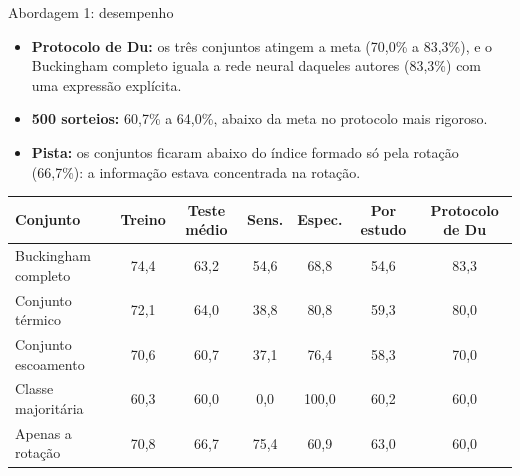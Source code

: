 \documentclass[aspectratio=169,11pt]{beamer}
\newenvironment{bullets}{\begin{itemize}\setlength{\itemsep}{5pt}}{\end{itemize}}
\begin{document}
\begin{frame}{Abordagem 1: desempenho}
\begin{bullets}
  \item \textbf{Protocolo de Du:} os três conjuntos atingem a meta (70,0\% a 83,3\%), e o Buckingham completo iguala a rede neural daqueles autores (83,3\%) com uma expressão explícita.
  \item \textbf{500 sorteios:} 60,7\% a 64,0\%, abaixo da meta no protocolo mais rigoroso.
  \item \textbf{Pista:} os conjuntos ficaram abaixo do índice formado só pela rotação (66,7\%): a informação estava concentrada na rotação.
\end{bullets}
\vspace{0.05cm}
\centering\scriptsize\setlength{\tabcolsep}{4pt}
\begin{tabular}{lcccccc}
\toprule
\textbf{Conjunto} & \textbf{Treino} & \textbf{Teste médio} & \textbf{Sens.} & \textbf{Espec.} & \textbf{Por estudo} & \textbf{Protocolo de Du} \\ \midrule
Buckingham completo & 74,4 & 63,2 & 54,6 & 68,8 & 54,6 & 83,3 \\
Conjunto térmico & 72,1 & 64,0 & 38,8 & 80,8 & 59,3 & 80,0 \\
Conjunto escoamento & 70,6 & 60,7 & 37,1 & 76,4 & 58,3 & 70,0 \\ \midrule
Classe majoritária & 60,3 & 60,0 & 0,0 & 100,0 & 60,2 & 60,0 \\
Apenas a rotação & 70,8 & 66,7 & 75,4 & 60,9 & 63,0 & 60,0 \\ \bottomrule
\end{tabular}
\end{frame}
\end{document}
